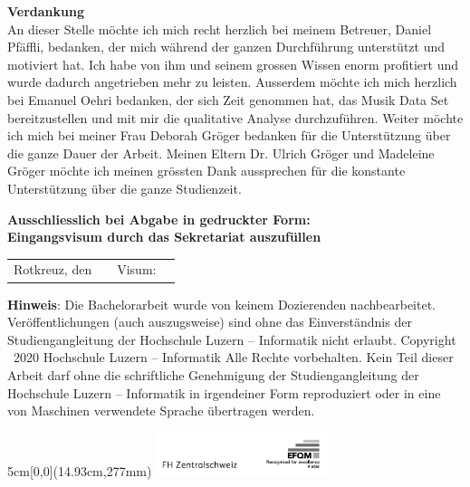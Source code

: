 \noindent
\textbf{Verdankung}\\
An dieser Stelle möchte ich mich recht herzlich bei meinem Betreuer, Daniel Pfäffli, bedanken, der mich während der ganzen Durchführung unterstützt und motiviert hat. Ich habe von ihm und seinem grossen Wissen enorm profitiert und wurde dadurch angetrieben mehr zu leisten. Ausserdem möchte ich mich herzlich bei Emanuel Oehri bedanken, der sich Zeit genommen hat, das Musik Data Set bereitzustellen und mit mir die qualitative Analyse durchzuführen. Weiter möchte ich mich bei meiner Frau Deborah Gröger bedanken für die Unterstützung über die ganze Dauer der Arbeit. Meinen Eltern Dr. Ulrich Gröger und Madeleine Gröger möchte ich meinen grössten Dank aussprechen für die konstante Unterstützung über die ganze Studienzeit.
\newline \newline \newline

\vspace{0.8cm}
\noindent
\textbf{Ausschliesslich bei Abgabe in gedruckter Form: \\ 
Eingangsvisum durch das Sekretariat auszufüllen}

\noindent
\renewcommand{\arraystretch}{2}
\begin{tabularx}{\textwidth}{@{}lXlX}
	Rotkreuz, den & & Visum: & \\
	\cline{2-2}
	\cline{4-4}
\end{tabularx}
\renewcommand{\arraystretch}{1}

\vfill
\noindent
{\textbf{Hinweis}}: Die Bachelorarbeit wurde von keinem Dozierenden nachbearbeitet. Ver\"offentlichungen (auch auszugsweise) sind ohne das Einverst\"andnis der Studiengangleitung der Hochschule Luzern -- Informatik nicht erlaubt. \newline \newline
Copyright \textcopyright\ {2020} Hochschule Luzern -- Informatik \newline \newline
Alle Rechte vorbehalten. Kein Teil dieser Arbeit darf ohne die schriftliche Genehmigung der Studiengangleitung der Hochschule Luzern -- Informatik in irgendeiner Form reproduziert oder in eine von Maschinen verwendete Sprache \"ubertragen werden.


\begin{textblock*}{5cm}[0,0](14.93cm,277mm)
	\includegraphics[keepaspectratio,width=5cm]{img/FHZ_Logo}
\end{textblock*}
